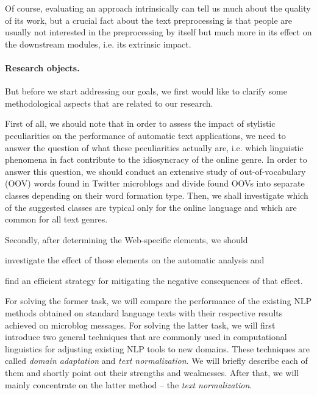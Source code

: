 Of course, evaluating an approach intrinsically can tell us much about the
quality of its work, but a crucial fact about the text preprocessing is that
people are usually not interested in the preprocessing by itself but much more
in its effect on the downstream modules, i.e. its extrinsic impact.



\paragraph{Research objects.}

But before we start addressing our goals, we first would like to clarify some
methodological aspects that are related to our research.

First of all, we should note that in order to assess the impact of stylistic
peculiarities on the performance of automatic text applications, we need to
answer the question of what these peculiarities actually are, i.e. which
linguistic phenomena in fact contribute to the idiosyncracy of the online
genre.  In order to answer this question, we should conduct an extensive study
of out-of-vocabulary (OOV) words found in Twitter microblogs and divide found
OOVs into separate classes depending on their word formation type.  Then, we
shall investigate which of the suggested classes are typical only for the
online language and which are common for all text genres.

Secondly, after determining the Web-specific elements, we should
\begin{inparaenum}
\item investigate the effect of those elements on the automatic analysis and
\item find an efficient strategy for mitigating the negative consequences of
  that effect.
\end{inparaenum}
For solving the former task, we will compare the performance of the existing
NLP methods obtained on standard language texts with their respective results
achieved on microblog messages.  For solving the latter task, we will first
introduce two general techniques that are commonly used in computational
linguistics for adjusting existing NLP tools to new domains.  These techniques
are called \emph{domain adaptation} and \emph{text normalization}.  We will
briefly describe each of them and shortly point out their strengths and
weaknesses.  After that, we will mainly concentrate on the latter method --
the \emph{text normalization}.

